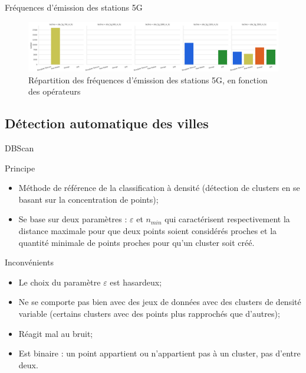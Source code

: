 \begin{frame}{Fréquences d'émission des stations 5G}
    \begin{figure}
        \includegraphics[width=0.9\paperwidth]{images/barplots/5G_freq.png}
        \caption{\label{fig:5g_freq}Répartition des fréquences d'émission des stations 5G, en fonction des opérateurs}
    \end{figure}
\end{frame}


\subsection{Détection automatique des villes}
\insertsubsectionframe

\begin{frame}{DBScan}
    \begin{block}{Principe}
        \begin{itemize}
            \item Méthode de référence de la classification à densité (détection de clusters en se basant sur la concentration de points);
            \item Se base sur deux paramètres : $\varepsilon$ et $n_{min}$ qui caractérisent respectivement la distance maximale pour que deux points soient considérés \og proches \fg{} et la quantité minimale de points proches pour qu'un cluster soit créé.
        \end{itemize}
    \end{block}

    \begin{block}{Inconvénients}
        \begin{itemize}
            \item Le choix du paramètre $\varepsilon$ est hasardeux;
            \item Ne se comporte pas bien avec des jeux de données avec des clusters de densité variable (certains clusters avec des points plus rapprochés que d'autres);
            \item Réagit mal au bruit;
            \item Est binaire : un point appartient ou n'appartient pas à un cluster, pas d'entre deux.
        \end{itemize}
    \end{block}
\end{frame}

